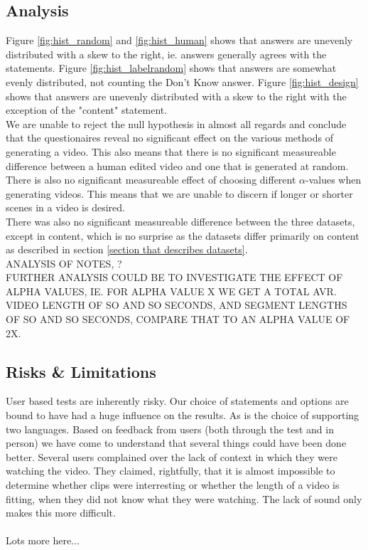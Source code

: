 \subsection{Analysis}
%
Figure \ref{fig:hist_random} and \ref{fig:hist_human} shows that answers are unevenly distributed with a skew to the right, ie. answers generally agrees with the statements. Figure \ref{fig:hist_labelrandom} shows that answers are somewhat evenly distributed, not counting the Don't Know answer. Figure \ref{fig:hist_design} shows that answers are unevenly distributed with a skew to the right with the exception of the "content" statement.\\
We are unable to reject the null hypothesis in almost all regards and conclude that the questionaires reveal no significant effect on the various methods of generating a video. This also means that there is no significant measureable difference between a human edited video and one that is generated at random.\\
%
There is also no significant measureable effect of choosing different $\alpha$-values when generating videos. This means that we are unable to discern if longer or shorter scenes in a video is desired.\\
%
There was also no significant measureable difference between the three datasets, except in content, which is no surprise as the datasets differ primarily on content as described in section \ref{section that describes datasets}.\\
%
ANALYSIS OF NOTES, ?\\
%
FURTHER ANALYSIS COULD BE TO INVESTIGATE THE EFFECT OF ALPHA VALUES, IE. FOR ALPHA VALUE X WE GET A TOTAL AVR. VIDEO LENGTH OF SO AND SO SECONDS, AND SEGMENT LENGTHS OF SO AND SO SECONDS, COMPARE THAT TO AN ALPHA VALUE OF 2X.\\
%
\subsection{Risks \& Limitations}
%
User based tests are inherently risky. Our choice of statements and options are bound to have had a huge influence on the results. As is the choice of supporting two languages. Based on feedback from users (both through the test and in person) we have come to understand that several things could have been done better. Several users complained over the lack of context in which they were watching the video. They claimed, rightfully, that it is almost impossible to determine whether clips were interresting or whether the length of a video is fitting, when they did not know what they were watching. The lack of sound only makes this more difficult.\\\\
%
Lots more here...
%
